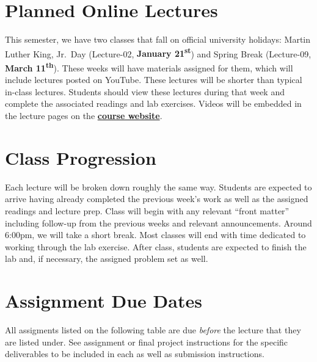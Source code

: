 \documentclass[]{book}
\begin{document}
\hypertarget{planned-online-lectures}{%
\section{Planned Online Lectures}\label{planned-online-lectures}}

This semester, we have two classes that fall on official university holidays: Martin Luther King, Jr.~Day (Lecture-02, \textbf{January 21\textsuperscript{st}}) and Spring Break (Lecture-09, \textbf{March 11\textsuperscript{th}}). These weeks will have materials assigned for them, which will include lectures posted on YouTube. These lectures will be shorter than typical in-class lectures. Students should view these lectures during that week and complete the associated readings and lab exercises. Videos will be embedded in the lecture pages on the \href{https://slu-soc5650.github.io/}{\textbf{course website}}.

\hypertarget{class-progression}{%
\section{Class Progression}\label{class-progression}}

Each lecture will be broken down roughly the same way. Students are expected to arrive having already completed the previous week's work as well as the assigned readings and lecture prep. Class will begin with any relevant ``front matter'' including follow-up from the previous weeks and relevant announcements. Around 6:00pm, we will take a short break. Most classes will end with time dedicated to working through the lab exercise. After class, students are expected to finish the lab and, if necessary, the assigned problem set as well.

\hypertarget{assignment-due-dates}{%
\section{Assignment Due Dates}\label{assignment-due-dates}}

All assigments listed on the following table are due \emph{before} the lecture that they are listed under. See assignment or final project instructions for the specific deliverables to be included in each as well as submission instructions.
\end{document}
